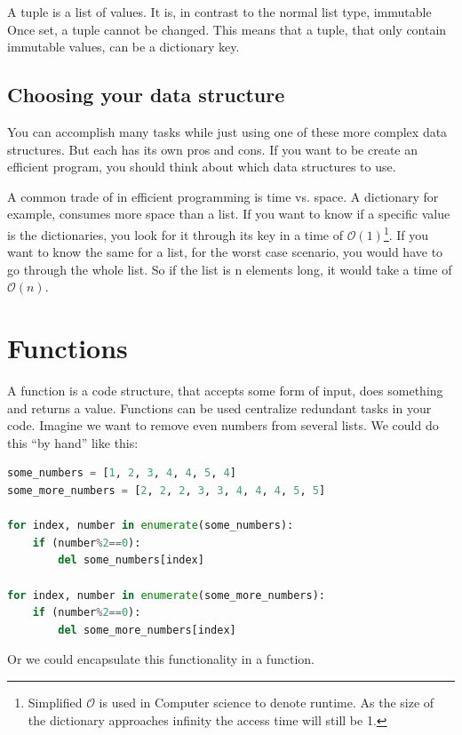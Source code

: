 \documentclass{article}
\newcommand{\qq}[1]{``#1''}
\begin{document}
A tuple is a list of values.
It is, in contrast to the normal list type, immutable
Once set, a tuple cannot be changed.
This means that a tuple, that only contain immutable values, can be a dictionary key.

\subsection{Choosing your data structure}

You can accomplish many tasks while just using one of these more complex data structures.
But each has its own pros and cons.
If you want to be create an efficient program, you should think about which data structures
to use.

A common trade of in efficient programming is time vs. space.
A dictionary for example, consumes more space than a list.
If you want to know if a specific value is the dictionaries, you look for
it through its key in a time of $\mathcal{O}(1)$\footnote{Simplified
    $\mathcal{O}$ is used in Computer science to denote runtime.
    As the size of the dictionary approaches infinity the access time will still be 1.
}.
If you want to know the same for a list, for the worst case scenario, you would
have to go through the whole list.
So if the list is n elements long, it would take a time of $\mathcal{O}(n)$.

\section{Functions}

A function is a code structure, that accepts some form of input, does something
and returns a value.
Functions can be used centralize redundant tasks in your code.
Imagine we want to remove even numbers from several lists.
We could do this \qq{by hand} like this:

\begin{lstlisting}[language=python]
some_numbers = [1, 2, 3, 4, 4, 5, 4]
some_more_numbers = [2, 2, 2, 3, 3, 4, 4, 4, 5, 5]

for index, number in enumerate(some_numbers):
    if (number%2==0):
        del some_numbers[index]

for index, number in enumerate(some_more_numbers):
    if (number%2==0):
        del some_more_numbers[index]
\end{lstlisting}

Or we could encapsulate this functionality in a function.
\end{document}
